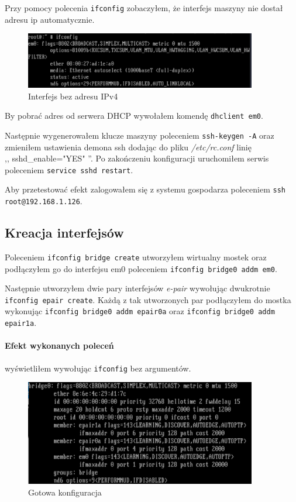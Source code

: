 \documentclass{mwart}
\begin{document}
Przy pomocy polecenia \texttt{ifconfig} zobaczyłem, że interfejs maszyny nie dostał adresu ip automatycznie.

\begin{figure}[H]
  \includegraphics[width=0.90\textwidth]{Interfejs_bez_ip}
  \centering
  \caption{Interfejs bez adresu IPv4}
  \label{fig:if_bez_ip}
\end{figure}

By pobrać adres od serwera DHCP wywołałem komendę \texttt{dhclient em0}.

Następnie wygenerowałem klucze maszyny poleceniem \texttt{ssh-keygen -A} oraz zmieniłem ustawienia demona ssh dodając do pliku \textit{/etc/rc.conf} linię \\ ,, sshd\_enable="YES" ''. Po zakończeniu konfiguracji uruchomiłem serwis poleceniem \texttt{service sshd restart}.

Aby przetestować efekt zalogowałem się z systemu gospodarza poleceniem \texttt{ssh root@192.168.1.126}.

\subsection{Kreacja interfejsów}
Poleceniem \texttt{ifconfig bridge create} utworzyłem wirtualny mostek oraz podłączyłem go do interfejsu em0 poleceniem \texttt{ifconfig bridge0 addm em0}.

Następnie utworzyłem dwie pary interfejsów \textit{e-pair} wywołując dwukrotnie \texttt{ifconfig epair create}. Każdą z tak utworzonych par podłączyłem do mostka wykonując \texttt{ifconfig bridge0 addm epair0a} oraz \texttt{ifconfig bridge0 addm epair1a}.

\paragraph{Efekt wykonanych poleceń} wyświetliłem wywołując \texttt{ifconfig} bez argumentów.

\begin{figure}[H]
  \includegraphics[width=0.90\textwidth]{Podlaczone_interfejsy}
  \centering
  \caption{Gotowa konfiguracja}
  \label{fig:konfiguracja_freebsd}
\end{figure}
\end{document}
